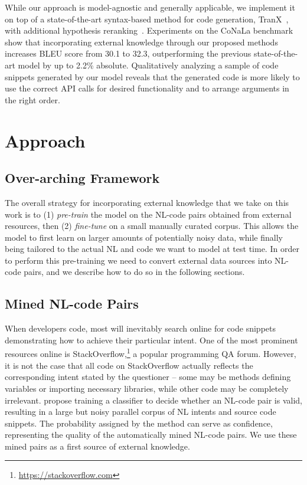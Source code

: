 \documentclass[11pt,a4paper]{article}
\begin{document}
While our approach is model-agnostic and generally applicable, we implement
it on top of a state-of-the-art syntax-based method for code 
generation, TranX~\cite{yin-neubig-2018-tranx}, with additional 
hypothesis reranking~\cite{yin-neubig-2019-reranking}.
Experiments on the CoNaLa benchmark~\cite{yin2018mining} show that 
incorporating external knowledge through our proposed methods increases 
BLEU score from 30.1 to 32.3, outperforming the previous state-of-the-art 
model by up to 2.2\% absolute.
Qualitatively analyzing a sample of code snippets generated by our model
reveals that the generated code is more likely to use the correct API calls 
for desired functionality and to arrange arguments in the right order.













\section{Approach}
\label{sec:data_sources}

\subsection{Over-arching Framework}
\label{sec:pre-training}

The overall strategy for incorporating external knowledge that we take on this work is to (1) \emph{pre-train} the model on the NL-code pairs obtained from external resources, then (2) \emph{fine-tune} on a small manually curated corpus.
This allows the model to first learn on larger amounts of potentially noisy data, while finally being tailored to the actual NL and code we want to model at test time.
In order to perform this pre-training we need to convert external data sources into NL-code pairs, and we describe how to do so in the following sections.

\subsection{Mined NL-code Pairs}
\label{sec:mined}
When developers code, most will inevitably search online for code snippets demonstrating how to achieve their particular intent.
One of the most prominent resources online is StackOverflow,\footnote{\url{https://stackoverflow.com}} a popular programming QA forum.
However, it is not the case that all code on StackOverflow actually reflects the corresponding intent stated by the questioner -- some may be methods defining variables or importing necessary libraries, while other code may be completely irrelevant.
\citet{yin2018mining} propose training a classifier to decide whether an NL-code pair is valid, resulting in a large but noisy parallel corpus of NL intents and source code snippets.
The probability assigned by the method can serve as confidence, representing the quality of the automatically mined NL-code pairs.
We use these mined pairs as a first source of external knowledge.
\end{document}
